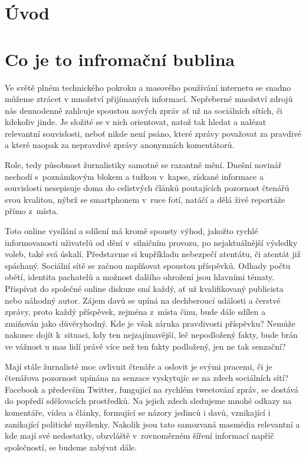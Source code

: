 \documentclass[12pt, a4paper]{article}
\numberwithin{equation}{section} 	%
\begin{document}

\newpage
\section*{Úvod}
\noindent


\newpage
\section{Co je to infromační bublina}
\noindent Ve světě plném technického pokroku a masového používání internetu se snadno můžeme ztrácet v množství přijímaných informací. Nepřeberné množství zdrojů nás dennodenně zahlcuje spoustou nových zpráv ať už na sociálních sítích, či kdekoliv jinde. Je složité se v nich orientovat, natož tak hledat a nalézat relevantní souvislosti, neboť nikde není psáno, které zprávy považovat za pravdivé a které naopak za nepravdivé zprávy anonymních komentátorů.

Role, tedy působnost žurnalistiky samotné se razantně mění. Dnešní novinář nechodí s poznámkovým blokem a tužkou v kapse, získané informace a souvislosti nesepisuje doma do celistvých článků poutajících pozornost čtenářů svou kvalitou, nýbrž se smartphonem v ruce fotí, natáčí a dělá živé reportáže přímo z místa.

Toto online vysílání a sdílení má kromě spousty výhod, jakožto rychlé informovanosti uživatelů od dění v silničním provozu, po nejaktuálnější výsledky voleb, také svá úskalí. Představme si kupříkladu nebezpečí atentátu, či atentát již spáchaný. Sociální sítě se začnou naplňovat spoustou příspěvků. Odhady počtu obětí, identita pachatelů a možnost dalšího ohrožení jsou hlavními tématy. Při\-spí\-vat do společné online diskuze smí každý, ať už kvalifikovaný publicista nebo náhodný autor. Zájem davů se upíná na dechberoucí události a čerstvé zprávy, proto každý příspěvek, zejména z místa činu, bude dále sdílen a zmiňován jako důvěryhodný. Kde je však záruka pravdivosti příspěvku? Nemůže nakonec dojít k situaci, kdy ten nejzajímavější, leč nepodložený fakty, bude brán ve vážnost u mas lidí právě více než ten fakty podložený, jen ne tak senzační?

Mají stále žurnalisté moc ovlivnit čtenáře a oslovit je svými pracemi, či je čtenářova pozornost upínána na senzace vyskytujíc se na zdech sociálních sítí? Facebook a především Twitter, fungující na rychlém tweetování zpráv, se dostává do popředí sdělovacích prostředků. Na jejich zdech sledujeme mnohé odkazy na komentáře, videa a články, formující se názory jedinců i davů, vznikající i zanikající politické myšlenky. Nakolik jsou tato samozvaná masmédia relevantní a kde mají své nedostatky, obzvláště v rovnoměrném šíření informací napříč společností, se budeme zabývat dále.
\end{document}
